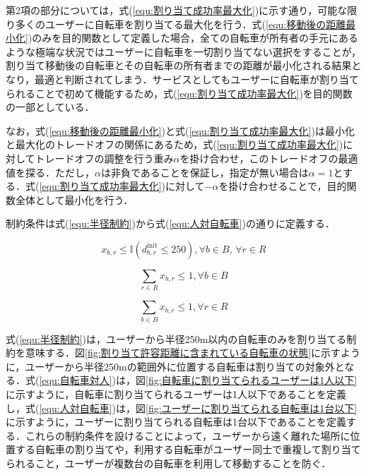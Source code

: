       \par 第2項の部分については，式(\ref{equ:割り当て成功率最大化})に示す通り，可能な限り多くのユーザーに自転車を割り当てる最大化を行う．式(\ref{equ:移動後の距離最小化})のみを目的関数として定義した場合，全ての自転車が所有者の手元にあるような極端な状況ではユーザーに自転車を一切割り当てない選択をすることが，割り当て移動後の自転車とその自転車の所有者までの距離が最小化される結果となり，最適と判断されてしまう．サービスとしてもユーザーに自転車が割り当てられることで初めて機能するため，式(\ref{equ:割り当て成功率最大化})を目的関数の一部としている．
      
      \par なお，式(\ref{equ:移動後の距離最小化})と式(\ref{equ:割り当て成功率最大化})は最小化と最大化のトレードオフの関係にあるため，式(\ref{equ:割り当て成功率最大化})に対してトレードオフの調整を行う重み$\alpha$を掛け合わせ，このトレードオフの最適値を探る．ただし，$\alpha$は非負であることを保証し，指定が無い場合は$\alpha=1$とする．式(\ref{equ:割り当て成功率最大化})に対して$-\alpha$を掛け合わせることで，目的関数全体として最小化を行う．
      
      \par 制約条件は式(\ref{equ:半径制約})から式(\ref{equ:人対自転車})の通りに定義する．
      
      \begin{equation}\label{equ:半径制約}
        x_{b, r} \leq \mathbb{I}(d^{\text{init}}_{b, r} \leq 250), \forall b \in B, \, \forall r \in R
      \end{equation}
      
      \begin{equation}\label{equ:自転車対人}
        \sum_{r \in R}x_{b,r} \leq 1, \forall b \in B
      \end{equation}
      
      \begin{equation}\label{equ:人対自転車}
        \sum_{b \in B}x_{b,r} \leq 1, \forall r \in R
      \end{equation}
      
      \par 式(\ref{equ:半径制約})は，ユーザーから半径250m以内の自転車のみを割り当てる制約を意味する．図\ref{fig:割り当て許容距離に含まれている自転車の状態}に示すように，ユーザーから半径250mの範囲外に位置する自転車は割り当ての対象外となる．式(\ref{equ:自転車対人})は，図\ref{fig:自転車に割り当てられるユーザーは1人以下}に示すように，自転車に割り当てられるユーザーは1人以下であることを定義し，式(\ref{equ:人対自転車})は，図\ref{fig:ユーザーに割り当てられる自転車は1台以下}に示すように，ユーザーに割り当てられる自転車は1台以下であることを定義する．これらの制約条件を設けることによって，ユーザーから遠く離れた場所に位置する自転車の割り当てや，利用する自転車がユーザー同士で重複して割り当てられること，ユーザーが複数台の自転車を利用して移動することを防ぐ．
      
